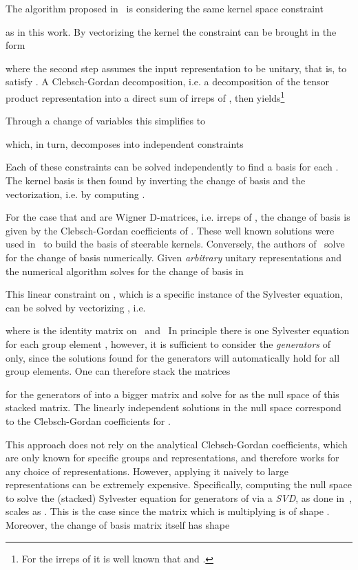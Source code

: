\documentclass{article}
\begin{document}
{{The algorithm proposed in~\cite{3d_steerableCNNs} is considering the same kernel space constraint

as in this work.
By vectorizing the kernel the constraint can be brought in the form

where the second step assumes the input representation to be unitary, that is, to satisfy .
A Clebsch-Gordan decomposition, i.e. a decomposition of the tensor product representation into a direct sum of irreps  of , then yields\footnote{For the irreps of  it is well known that  and .}

Through a change of variables  this simplifies to

which, in turn, decomposes into  independent constraints

Each of these constraints can be solved independently to find a basis for each .
The kernel basis is then found by inverting the change of basis and the vectorization, i.e. by computing .

For the case that  and  are Wigner D-matrices, i.e. irreps of , the change of basis  is given by the Clebsch-Gordan coefficients of .
These well known solutions were used in~\cite{TensorFieldNets,Kondor2018-NBN,kondorClebschGordanNets2018,anderson2019cormorant} to build the basis of steerable kernels.
Conversely, the authors of~\cite{3d_steerableCNNs} solve for the change of basis  numerically.
Given \textit{arbitrary} unitary representations  and  the numerical algorithm solves for the change of basis in

This linear constraint on , which is a specific instance of the Sylvester equation, can be solved by vectorizing , i.e.

where  is the identity matrix on ~and~
In principle there is one Sylvester equation for each group element , however, it is sufficient to consider the \textit{generators} of  only, since the solutions found for the generators will automatically hold for all group elements.
One can therefore stack the matrices

for the generators of  into a bigger matrix and solve for  as the null space of this stacked matrix.
The linearly independent solutions  in the null space correspond to the Clebsch-Gordan coefficients for .

This approach does not rely on the analytical Clebsch-Gordan coefficients, which are only known for specific groups and representations, and therefore works for any choice of representations.
However, applying it naively to large representations can be extremely expensive.
Specifically, computing the null space to solve the (stacked) Sylvester equation for  generators of  via a \textit{SVD}, as done in~\cite{3d_steerableCNNs}, scales as .
This is the case since the matrix which is multiplying  is of shape
.
Moreover, the change of basis matrix  itself has shape

}}
\end{document}
